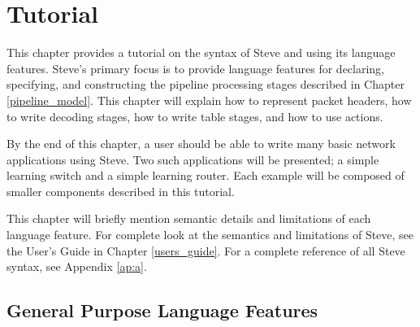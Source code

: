 \chapter{Tutorial} \label{tutorial}

This chapter provides a tutorial on the syntax of Steve and using its language features. Steve's primary focus is to provide language features for declaring, specifying, and constructing the pipeline processing stages described in Chapter \ref{pipeline_model}. This chapter will explain how to represent packet headers, how to write decoding stages, how to write table stages, and how to use actions.

By the end of this chapter, a user should be able to write many basic network applications using Steve. Two such applications will be presented; a simple learning switch and a simple learning router. Each example will be composed of smaller components described in this tutorial. 

This chapter will briefly mention semantic details and limitations of each language feature. For complete look at the semantics and limitations of Steve, see the User's Guide in Chapter \ref{users_guide}. For a complete reference of all Steve syntax, see Appendix \ref{ap:a}.

\section{General Purpose Language Features} \label{gen_purp_tut}

